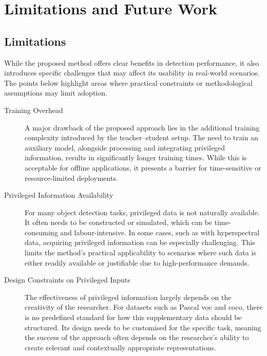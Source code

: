 \section{Limitations and Future Work}
\label{sec:6_future_work}

\subsection*{Limitations}

While the proposed method offers clear benefits in detection performance, it also introduces specific challenges that may affect its usability in real-world scenarios. The points below highlight areas where practical constraints or methodological assumptions may limit adoption.

\begin{description}

\item[Training Overhead]
A major drawback of the proposed approach lies in the additional training complexity introduced by the teacher–student setup. The need to train an auxiliary model, alongside processing and integrating privileged information, results in significantly longer training times. While this is acceptable for offline applications, it presents a barrier for time-sensitive or resource-limited deployments.

\item[Privileged Information Availability]
For many object detection tasks, privileged data is not naturally available. It often needs to be constructed or simulated, which can be time-consuming and labour-intensive. In some cases, such as with hyperspectral data, acquiring privileged information can be especially challenging. This limits the method’s practical applicability to scenarios where such data is either readily available or justifiable due to high-performance demands.

\item[Design Constraints on Privileged Inputs]
The effectiveness of privileged information largely depends on the creativity of the researcher. For datasets such as Pascal \gls{voc} and \gls{coco}, there is no predefined standard for how this supplementary data should be structured. Its design needs to be customised for the specific task, meaning the success of the approach often depends on the researcher’s ability to create relevant and contextually appropriate representations.

\end{description}

